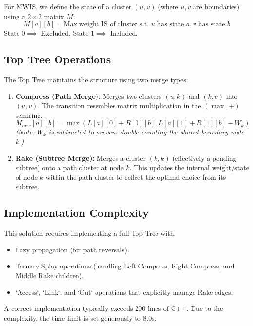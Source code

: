 \documentclass[11pt]{article}
\begin{document}
For MWIS, we define the state of a cluster $(u, v)$ (where $u, v$ are boundaries) using a $2 \times 2$ matrix $M$:
$$ M[a][b] = \text{Max weight IS of cluster s.t. } u \text{ has state } a, v \text{ has state } b $$
State $0 \implies$ Excluded, State $1 \implies$ Included.

\subsection*{Top Tree Operations}
The Top Tree maintains the structure using two merge types:
\begin{enumerate}
    \item \textbf{Compress (Path Merge):} Merges two clusters $(u, k)$ and $(k, v)$ into $(u, v)$.
    The transition resembles matrix multiplication in the $(\max, +)$ semiring.
    $$ M_{new}[a][b] = \max(L[a][0] + R[0][b], L[a][1] + R[1][b] - W_k) $$
    \textit{(Note: $W_k$ is subtracted to prevent double-counting the shared boundary node $k$.)}
    
    \item \textbf{Rake (Subtree Merge):} Merges a cluster $(k, k)$ (effectively a pending subtree) onto a path cluster at node $k$.
    This updates the internal weight/state of node $k$ within the path cluster to reflect the optimal choice from its subtree.
\end{enumerate}

\subsection*{Implementation Complexity}
This solution requires implementing a full Top Tree with:
\begin{itemize}
    \item Lazy propagation (for path reversals).
    \item Ternary Splay operations (handling Left Compress, Right Compress, and Middle Rake children).
    \item `Access`, `Link`, and `Cut` operations that explicitly manage Rake edges.
\end{itemize}
A correct implementation typically exceeds 200 lines of C++. Due to the complexity, the time limit is set generously to 8.0s.
\end{document}

